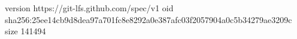 version https://git-lfs.github.com/spec/v1
oid sha256:25ee14cb9d8dea97a701fc8e8292a0e387afc03f2057904a0c5b34279ae3209c
size 141494
